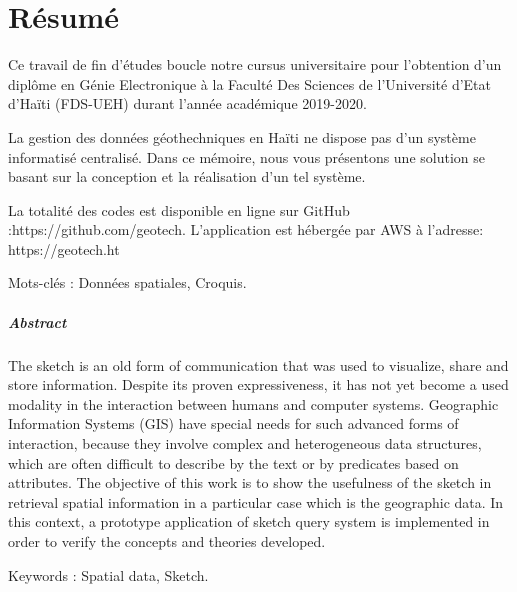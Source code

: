 \chapter{Résumé}
Ce travail de fin d’études boucle notre cursus 
universitaire pour l'obtention d'un diplôme en 
Génie Electronique à la Faculté Des Sciences de 
l'Université d'Etat d'Haïti (FDS-UEH) durant l’année 
académique 2019-2020. \par 
La gestion des données géothechniques en Haïti 
ne dispose pas d’un système informatisé centralisé. 
Dans ce mémoire, nous vous présentons une solution 
se basant sur la conception et la réalisation d'un 
tel système. \par 
La totalité des codes est disponible en ligne sur 
GitHub :https://github.com/geotech. L’application est 
hébergée par AWS à l’adresse: https://geotech.ht \par 
Mots-clés : Données spatiales, Croquis.

\paragraph{Abstract}
\par 
The sketch is an old form of communication that was 
used to visualize, share and store information. 
Despite its proven expressiveness, it has not yet 
become a used modality in the interaction between 
humans and computer systems. Geographic Information 
Systems (GIS) have special needs for such advanced 
forms of interaction, because they involve complex and
heterogeneous data structures, which are often 
difficult to describe by the text or by predicates 
based on attributes. The objective of this work is to 
show the usefulness of the sketch in retrieval spatial 
information in a particular case which is the 
geographic data. In this context, a prototype 
application of sketch query system is implemented 
in order to verify the concepts and theories 
developed. \par 
Keywords : Spatial data, Sketch.